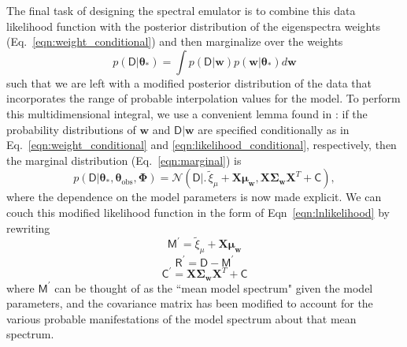 \documentclass[iop,floatfix,numberedappendix,twocolappendix]{emulateapj}
\newcommand{\vt}{ {\bm \theta}}
\begin{document}
The final task of designing the spectral emulator is to combine this data likelihood function with the posterior distribution of the eigenspectra weights (Eq.~\ref{eqn:weight_conditional}) and then marginalize over the weights
\begin{equation}
  p(\mathsf{D} | \vt_\ast) = \int p(\mathsf{D} | \mathbf{w}) p( \mathbf{w} | \vt_\ast) d \mathbf{w}
  \label{eqn:marginal}
\end{equation}
such that we are left with a modified posterior distribution of the data that incorporates the 
range of probable interpolation values for the model.  To perform this multidimensional integral, 
we use a convenient lemma found in \citet[their Appendix A]{gelman13}: if the probability 
distributions of $\mathbf{w}$ and $\mathsf{D} | \mathbf{w}$ are specified conditionally as in 
Eq.~\ref{eqn:weight_conditional} and \ref{eqn:likelihood_conditional}, respectively, then the 
marginal distribution (Eq.~\ref{eqn:marginal}) is
\begin{equation}
  p(\mathsf{D} | \vt_\ast, \vt_\textrm{obs}, \mathbf{\Phi}) = \mathcal{N} \left ( \mathsf{D} \bigl | \bigr .\, \widetilde{\xi}_\mu + \mathbf{X} \mathbf{\mu}_\mathbf{w}, \mathbf{X} \mathbf{\Sigma}_\mathbf{w} \mathbf{X}^T + \mathsf{C} \right),
\end{equation}
where the dependence on the model parameters is now made explicit.  We can couch this modified 
likelihood function in the form of Eqn~\ref{eqn:lnlikelihood} by rewriting
\begin{equation}
  \mathsf{M}^\prime = \widetilde{\xi}_\mu + \mathbf{X} \mathbf{\mu}_\mathbf{w}
\end{equation}
\begin{equation}
  \mathsf{R}^\prime = \mathsf{D} - \mathsf{M}^\prime 
\end{equation}
\begin{equation}
  \mathsf{C}^\prime = \mathbf{X} \mathbf{\Sigma}_\mathbf{w} \mathbf{X}^T + \mathsf{C}
\end{equation}
where $\mathsf{M}^\prime$ can be thought of as the ``mean model spectrum" given the model 
parameters, and the covariance matrix has been modified to account for the various probable 
manifestations of the model spectrum about that mean spectrum.



\end{document}
